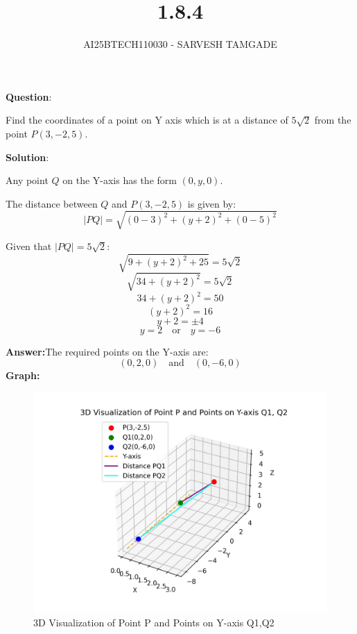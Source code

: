 \documentclass[journal,12pt,onecolumn]{IEEEtran}
\title{1.8.4}
\author{AI25BTECH110030 - SARVESH TAMGADE}
\begin{document}
{\let\newpage\relax\maketitle}

\textbf{Question}:

Find the coordinates of a point on Y axis which is at a distance of \( 5\sqrt{2} \) from the point \( P(3, -2, 5) \).

\textbf{Solution}:

Any point \( Q \) on the Y-axis has the form \( (0, y, 0) \).

The distance between \( Q \) and \( P(3,-2,5) \) is given by:
\[
|PQ| = \sqrt{(0-3)^2 + (y+2)^2 + (0-5)^2}
\]

Given that \( |PQ| = 5\sqrt{2} \):
\[
\sqrt{9 + (y+2)^2 + 25} = 5\sqrt{2}
\]
\[
\sqrt{34 + (y+2)^2} = 5\sqrt{2}
\]
\[
34 + (y+2)^2 = 50
\]
\[
(y+2)^2 = 16
\]
\[
y + 2 = \pm 4
\]
\[
y = 2 \quad \text{or} \quad y = -6
\]

\textbf{Answer:}\quad The required points on the Y-axis are:\quad
\[(0, 2, 0) \quad \text{and} \quad (0, -6, 0)\]
\textbf{Graph:}
\begin{figure}[H]
	\centering
	\includegraphics[width=0.8\columnwidth]{FIG/graph.png}
	\caption{3D Visualization of Point P and Points on Y-axis Q1,Q2}
	\label{img}
\end{figure}
\end{document}
